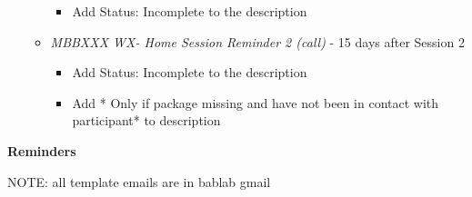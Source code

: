 \documentclass[]{book}
\providecommand{\tightlist}{%
  \setlength{\itemsep}{0pt}\setlength{\parskip}{0pt}}
\begin{document}
\begin{itemize}
\begin{itemize}
    \begin{itemize}
    \tightlist
    \item
      Add Status: Incomplete to the description
    \end{itemize}
  \item
    \emph{MBBXXX WX- Home Session Reminder 2 (call)} - 15 days after Session 2

    \begin{itemize}
    \tightlist
    \item
      Add Status: Incomplete to the description
    \item
      Add * Only if package missing and have not been in contact with participant* to description
    \end{itemize}
  \end{itemize}
\end{itemize}

\textbf{Reminders}

NOTE: all template emails are in bablab gmail
\end{document}
